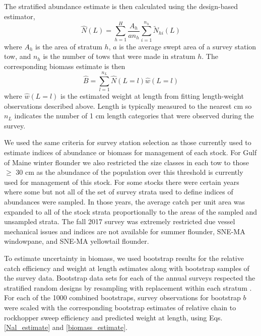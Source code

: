 \documentclass[]{article}
\begin{document}
The stratified abundance estimate is then calculated using the
design-based estimator, \begin{equation}\label{Nal_estimate}
 \widehat N(L) = \sum^H_{h=1} \frac{A_h}{an_h}\sum^{n_h}_{i=1} \widetilde N_{hi}(L)
\end{equation} where \(A_h\) is the area of stratum \(h\), \(a\) is the
average swept area of a survey station tow, and \(n_h\) is the number of
tows that were made in stratum \(h\). The corresponding biomass estimate
is then \begin{equation}\label{biomass_estimate}
 \widehat B = \sum^{n_L}_{l=1} \widehat N(L = l) \widehat w(L=l)
\end{equation} where \(\widehat w(L=l)\) is the estimated weight at
length from fitting length-weight observations described above. Length
is typically measured to the nearest cm so \(n_L\) indicates the number
of 1 cm length categories that were observed during the survey.

We used the same criteria for survey station selection as those
currently used to estimate indices of abundance or biomass for
management of each stock. For Gulf of Maine winter flounder we also
restricted the size classes in each tow to those \(\geq\) 30 cm as the
abundance of the population over this threshold is currently used for
management of this stock. For some stocks there were certain years where
some but not all of the set of survey strata used to define indices of
abundances were sampled. In those years, the average catch per unit area
was expanded to all of the stock strata proportionally to the areas of
the sampled and unsampled strata. The fall 2017 survey was extremely
restricted due vessel mechanical issues and indices are not available
for summer flounder, SNE-MA windowpane, and SNE-MA yellowtail flounder.

To estimate uncertainty in biomass, we used bootstrap results for the
relative catch efficiency and weight at length estimates along with
bootstrap samples of the survey data. Bootstrap data sets for each of
the annual surveys respected the stratified random designs by resampling
with replacement within each stratum \citep{smith97}. For each of the
1000 combined bootstraps, survey observations for bootstrap \(b\) were
scaled with the corresponding bootstrap estimates of relative chain to
rockhopper sweep efficiency and predicted weight at length, using Eqs.
\ref{Nal_estimate} and \ref{biomass_estimate}.
\end{document}
